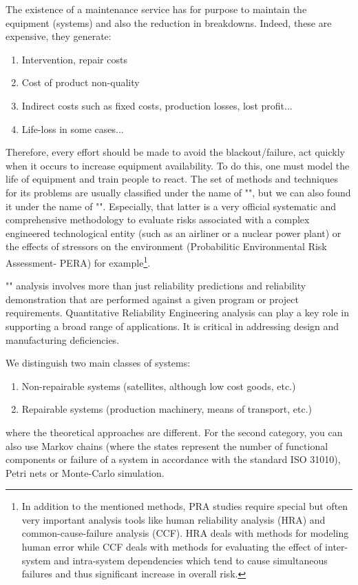 	The existence of a maintenance service has for purpose to maintain the equipment (systems) and also the reduction in breakdowns. Indeed, these are expensive, they generate:
	\begin{enumerate}
		\item Intervention, repair costs		
		\item Cost of product non-quality		
		\item Indirect costs such as fixed costs, production losses, lost profit...
		\item Life-loss in some cases...
	\end{enumerate}
	Therefore, every effort should be made to avoid the blackout/failure, act quickly when it occurs to increase equipment availability. To do this, one must model the life of equipment and train people to react. The set of methods and techniques for its problems are usually classified under the name of "", but we can also found it under the name of "". Especially, that latter is a very official systematic and comprehensive methodology to evaluate risks associated with a complex engineered technological entity (such as an airliner or a nuclear power plant) or the effects of stressors on the environment (Probabilitic Environmental Risk Assessment- PERA) for example\footnote{In addition to the mentioned methods, PRA studies require special but often very important analysis tools like human reliability analysis (HRA) and common-cause-failure analysis (CCF). HRA deals with methods for modeling human error while CCF deals with methods for evaluating the effect of inter-system and intra-system dependencies which tend to cause simultaneous failures and thus significant increase in overall risk.}.
	
	"" analysis involves more than just reliability predictions and reliability demonstration that are performed against a given program or project requirements. Quantitative Reliability Engineering analysis can play a key role in supporting a broad range of applications. It is critical in addressing design and manufacturing deficiencies.
	
	We distinguish two main classes of systems:
	\begin{enumerate}		
		\item Non-repairable systems (satellites, although low cost goods, etc.)
		\item Repairable systems (production machinery, means of transport, etc.)
	\end{enumerate}
	where the theoretical approaches are different. For the second category, you can also use Markov chains (where the states represent the number of functional components or failure of a system in accordance with the standard ISO 31010), Petri nets or Monte-Carlo simulation.
		
